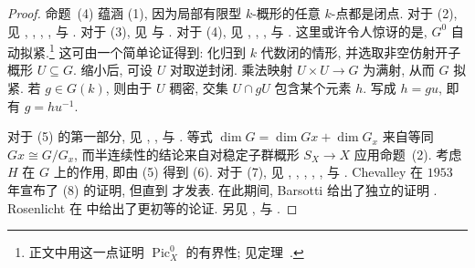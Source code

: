 \begin{proof}
命题~(4) 蕴涵 (1), 因为局部有限型 $k$-概形的任意 $k$-点都是闭点. 对于 (2), 见 \cite[\S$15$]{Car62}, \cite{Oor66}, \cite[第 $167$ 页]{Mum66a}, \cite[\S$11.4$]{Wat79}, \cite[定理 $3.23$ 及推论 $8.39$]{Mil17} 与 \cite[Tag 047N]{SP}. 对于 (3), 见 \cite[命题 $1.26$ 及推论 $1.39$]{Mil17} 与 \cite[Tags 047P, 047R]{SP}. 对于 (4), 见 \cite[\S$6.7$]{Wat79}, \cite[\S$7.3$]{Hum75}, \cite[命题 $2.2.1$]{Spr98}, \cite[命题 $1.34$]{Mil17} 与 \cite[Tag 0B7R]{SP}. 这里或许令人惊讶的是, $G^0$ 自动拟紧.\footnote{正文中用这一点证明 $\operatorname{Pic}_X^0$ 的有界性; 见定理~.} 这可由一个简单论证得到: 化归到 $k$ 代数闭的情形, 并选取非空仿射开子概形 $U\subseteq G$. 缩小后, 可设 $U$ 对取逆封闭. 乘法映射 $U\times U\to G$ 为满射, 从而 $G$ 拟紧. 若 $g\in G(k)$, 则由于 $U$ 稠密, 交集 $U\cap gU$ 包含某个元素 $h$. 写成 $h=gu$, 即有 $g=hu^{-1}$.

对于 (5) 的第一部分, 见 \cite[\S I.$1.8$]{Bor91}, \cite[\S$8.3$]{Hum75}, \cite[引理 $2.3.3$]{Spr98} 与 \cite[命题 $1.68$]{Mil17}. 等式 $\dim G=\dim Gx+\dim G_x$ 来自等同 $Gx\cong G/G_x$, 而半连续性的结论来自对稳定子群概形 $S_X\to X$ 应用命题~(2). 考虑 $H$ 在 $G$ 上的作用, 即由 (5) 得到 (6). 对于 (7), 见 \cite[第 $128$ 页]{Cho57}, \cite[定理 $6.8$]{Bor91}, \cite[推论 VI.$2.6$]{Ray70}, \cite[定理 $5.2.2$]{Bri17}, \cite[\S$12$]{Hum75}, \cite[定理 $5.5.5$]{Spr98} 与 \cite[定理 $8.44$]{Mil17}. Chevalley 在 $1953$ 年宣布了 (8) 的证明, 但直到 \cite{Che60} 才发表. 在此期间, Barsotti 给出了独立的证明 \cite{Bar55a,Bar55b}. Rosenlicht 在 \cite{Ros56} 中给出了更初等的论证. 另见 \cite{Con02}, \cite[定理 $1$, $2$]{Bri17} 与 \cite[定理 $8.27$]{Mil17}.
\end{proof}

